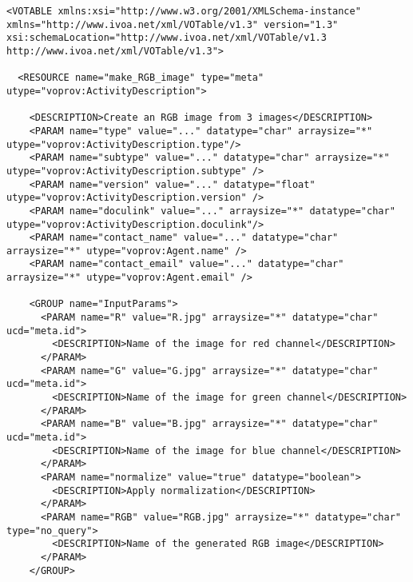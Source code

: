 \begin{verbatim}
<VOTABLE xmlns:xsi="http://www.w3.org/2001/XMLSchema-instance" xmlns="http://www.ivoa.net/xml/VOTable/v1.3" version="1.3" xsi:schemaLocation="http://www.ivoa.net/xml/VOTable/v1.3 http://www.ivoa.net/xml/VOTable/v1.3">
    
  <RESOURCE name="make_RGB_image" type="meta" utype="voprov:ActivityDescription">
      
    <DESCRIPTION>Create an RGB image from 3 images</DESCRIPTION>
    <PARAM name="type" value="..." datatype="char" arraysize="*" utype="voprov:ActivityDescription.type"/>
    <PARAM name="subtype" value="..." datatype="char" arraysize="*" utype="voprov:ActivityDescription.subtype" />
    <PARAM name="version" value="..." datatype="float" utype="voprov:ActivityDescription.version" />
    <PARAM name="doculink" value="..." arraysize="*" datatype="char" utype="voprov:ActivityDescription.doculink"/>
    <PARAM name="contact_name" value="..." datatype="char" arraysize="*" utype="voprov:Agent.name" />
    <PARAM name="contact_email" value="..." datatype="char" arraysize="*" utype="voprov:Agent.email" />
        
    <GROUP name="InputParams">
      <PARAM name="R" value="R.jpg" arraysize="*" datatype="char" ucd="meta.id">
        <DESCRIPTION>Name of the image for red channel</DESCRIPTION>
      </PARAM>
      <PARAM name="G" value="G.jpg" arraysize="*" datatype="char" ucd="meta.id">
        <DESCRIPTION>Name of the image for green channel</DESCRIPTION>
      </PARAM>
      <PARAM name="B" value="B.jpg" arraysize="*" datatype="char" ucd="meta.id">
        <DESCRIPTION>Name of the image for blue channel</DESCRIPTION>
      </PARAM>
      <PARAM name="normalize" value="true" datatype="boolean">
        <DESCRIPTION>Apply normalization</DESCRIPTION>
      </PARAM>
      <PARAM name="RGB" value="RGB.jpg" arraysize="*" datatype="char" type="no_query">
        <DESCRIPTION>Name of the generated RGB image</DESCRIPTION>
      </PARAM>
    </GROUP>
		

\end{verbatim}
